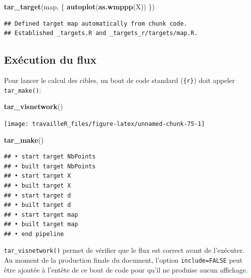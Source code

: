 \documentclass[
  12pt,
  french,
  a4paper,
  extrafontsizes,onecolumn,openright
  ]{memoir}
\newenvironment{Shaded}{\begin{snugshade}}{\end{snugshade}}
\newcommand{\KeywordTok}[1]{\textcolor[rgb]{0.13,0.29,0.53}{\textbf{#1}}}
\newcommand{\NormalTok}[1]{#1}
\begin{document}
\scriptsize

\begin{Shaded}
\begin{Highlighting}[]
\KeywordTok{tar_target}\NormalTok{(map, \{}
    \KeywordTok{autoplot}\NormalTok{(}\KeywordTok{as.wmppp}\NormalTok{(X))}
\NormalTok{\})}
\end{Highlighting}
\end{Shaded}

\begin{verbatim}
## Defined target map automatically from chunk code.
## Established _targets.R and _targets_r/targets/map.R.
\end{verbatim}

\normalsize

\hypertarget{exuxe9cution-du-flux}{%
\subsection{Exécution du flux}\label{exuxe9cution-du-flux}}

Pour lancer le calcul des cibles, un bout de code standard (\texttt{\{r\}}) doit appeler \texttt{tar\_make()}:

\scriptsize

\begin{Shaded}
\begin{Highlighting}[]
\KeywordTok{tar_visnetwork}\NormalTok{()}
\end{Highlighting}
\end{Shaded}

\begin{center}\texttt{[image: travailleR\_files/figure-latex/unnamed-chunk-75-1]} \end{center}

\begin{Shaded}
\begin{Highlighting}[]
\KeywordTok{tar_make}\NormalTok{()}
\end{Highlighting}
\end{Shaded}

\begin{verbatim}
## • start target NbPoints
## • built target NbPoints
## • start target X
## • built target X
## • start target d
## • built target d
## • start target map
## • built target map
## • end pipeline
\end{verbatim}

\normalsize

\texttt{tar\_visnetwork()} permet de vérifier que le flux est correct avant de l'exécuter.
Au moment de la production finale du document, l'option \texttt{include=FALSE} peut être ajoutée à l'entête de ce bout de code pour qu'il ne produise aucun affichage.
\end{document}
